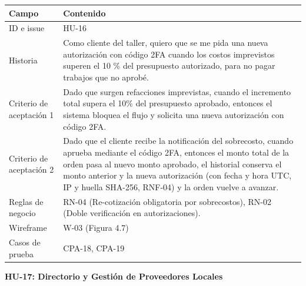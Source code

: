 {\def\LTcaptype{none} %
\begin{longtable}[]{@{}
  >{\raggedright\arraybackslash}p{}
  >{\raggedright\arraybackslash}p{}@{}}
\toprule\noalign{}
\begin{minipage}[b]{\linewidth}\raggedright
\textbf{Campo}
\end{minipage} & \begin{minipage}[b]{\linewidth}\raggedright
\textbf{Contenido}
\end{minipage} \\
\midrule\noalign{}
\endhead
\bottomrule\noalign{}
\endlastfoot
ID e issue & HU-16 \\
Historia & Como cliente del taller, quiero que se me pida una nueva
autorización con código 2FA cuando los costos imprevistos superen el 10
\% del presupuesto autorizado, para no pagar trabajos que no aprobé. \\
Criterio de aceptación 1 & Dado que surgen refacciones imprevistas,
cuando el incremento total supera el 10\% del presupuesto aprobado,
entonces el sistema bloquea el flujo y solicita una nueva autorización
con código 2FA. \\
Criterio de aceptación 2 & Dado que el cliente recibe la notificación
del sobrecosto, cuando aprueba mediante el código 2FA, entonces el
monto total de la orden pasa al nuevo monto aprobado, el historial
conserva el monto anterior y la nueva autorización (con fecha y hora
UTC, IP y huella SHA-256, RNF-04) y la orden vuelve a avanzar. \\
Reglas de negocio & RN-04 (Re-cotización obligatoria por sobrecostos),
RN-02 (Doble verificación en autorizaciones). \\
Wireframe & W-03 (Figura 4.7) \\
Casos de prueba & CPA-18, CPA-19 \\
\end{longtable}
}

\textbf{HU-17: Directorio y Gestión de Proveedores Locales}

